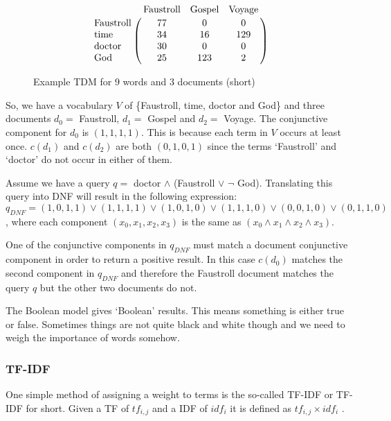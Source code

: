 \begin{figure}[!htbp]
\[
  \bbordermatrix{
    ~                  & \text{Faustroll} & \text{Gospel} & \text{Voyage} \cr
    \text{Faustroll}   & 77               & 0             & 0             \cr
    \text{time}        & 34               & 16            & 129           \cr
    \text{doctor}      & 30               & 0             & 0             \cr
    \text{God}         & 25               & 123           & 2
  }
\]
\caption[Example TDM (short)]{Example TDM for 9 words and 3 documents (short)}
\label{fig:termdocs2}
\end{figure}

So, we have a vocabulary $V$ of \{Faustroll, time, doctor and God\} and three documents $d_0 =$ Faustroll, $d_1 =$ Gospel and $d_2 =$ Voyage. The conjunctive component for $d_0$ is $(1,1,1,1)$. This is because each term in $V$ occurs at least once. $c(d_1)$ and $c(d_2)$ are both $(0,1,0,1)$ since the terms `Faustroll' and `doctor' do not occur in either of them.

Assume we have a query $q =$ doctor $\land$ (Faustroll $\lor$ $\neg$ God). Translating this query into \ac{DNF} will result in the following expression: $q_{DNF} = (1,0,1,1) \lor (1,1,1,1) \lor (1,0,1,0) \lor (1,1,1,0) \lor (0,0,1,0) \lor (0,1,1,0)$, where each component $(x_0,x_1,x_2,x_3)$ is the same as $(x_0 \land x_1 \land x_2 \land x_3)$.


One of the conjunctive components in $q_{DNF}$ must match a document conjunctive component in order to return a positive result. In this case $c(d_0)$ matches the second component in $q_{DNF}$ and therefore the Faustroll document matches the query $q$ but the other two documents do not.

The Boolean model gives `Boolean' results. This means something is either true or false. Sometimes things are not quite black and white though and we need to weigh the importance of words somehow.


\subsubsection{TF-IDF}
\label{s:tfidf}

One simple method of assigning a weight to terms is the so-called \acl{TF}-\acl{IDF} or \acs{TF}-\acs{IDF} for short. Given a \acs{TF} of $tf_{i,j}$ and a \acs{IDF} of $idf_i$ it is defined as $tf_{i,j}\times idf_i$ \autocite{Baeza-Yates2011}.

